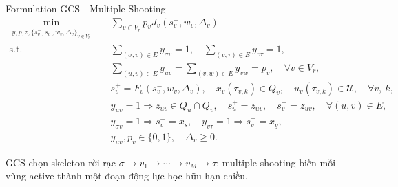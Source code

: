 \documentclass[aspectratio=169]{beamer}
\begin{document}
\begin{frame}{Formulation GCS - Multiple Shooting}
    \footnotesize
    \[
        \begin{aligned}
            \min_{\substack{y,p,z,\{s_v^-,s_v^+,w_v,\Delta_v\}_{v\in V_r}}}
            \quad
             &
            \sum_{v\in V_r} p_v J_v(s_v^-,w_v,\Delta_v)
            \\
            \text{s.t.}\quad
             &
            \sum_{(\sigma,v)\in E} y_{\sigma v}=1,\quad
            \sum_{(v,\tau)\in E} y_{v\tau}=1,
            \\
             &
            \sum_{(u,v)\in E}y_{uv}
            =
            \sum_{(v,w)\in E}y_{vw}
            =
            p_v,\quad \forall v\in V_r,
            \\
             &
            s_v^+=F_v(s_v^-,w_v,\Delta_v),\quad
            x_v(\tau_{v,k})\in Q_v,\quad
            u_v(\tau_{v,k})\in\mathcal U,
            \quad \forall v,\ k,
            \\
             &
            y_{uv}=1\Rightarrow
            z_{uv}\in Q_u\cap Q_v,\quad
            s_u^+=z_{uv},\quad s_v^-=z_{uv},
            \quad \forall (u,v)\in E,
            \\
             &
            y_{\sigma v}=1\Rightarrow s_v^-=x_s,\quad
            y_{v\tau}=1\Rightarrow s_v^+=x_g,
            \\
             &
            y_{uv},p_v\in\{0,1\},\quad \Delta_v\ge0.
        \end{aligned}
    \]

    \vspace{0.3em}

    GCS chọn skeleton rời rạc $\sigma\to v_1\to\cdots\to v_M\to\tau$; multiple
    shooting biến mỗi vùng active thành một đoạn động lực học hữu hạn chiều.

\end{frame}
\end{document}
